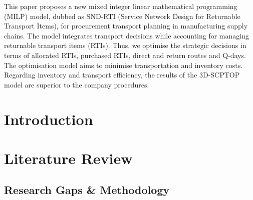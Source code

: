 This paper proposes a new mixed integer linear mathematical programming (MILP) model, dubbed as SND-RTI (Service Network Design for Returnable Transport Items), for procurement transport planning in manufacturing supply chains. 
The model integrates transport decisions while accounting for managing returnable transport items (RTIs).
Thus, we optimise the strategic decisions in terms of allocated RTIs, purchased RTIs, direct and return routes and Q-days.
The optimisation model aims to minimise transportation and inventory costs.
Regarding inventory and transport efficiency, the results of the 3D-SCPTOP model are superior to the company procedures.

\section{Introduction}

\section{Literature Review}

\subsection{Research Gaps \& Methodology}






% 


% 


